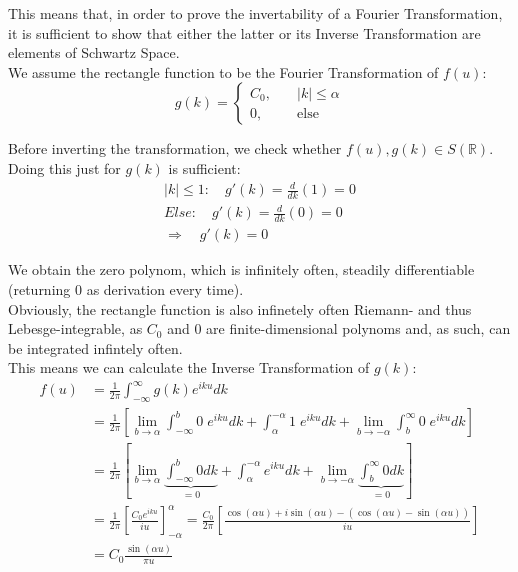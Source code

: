 \documentclass[a4paper,german,12pt,smallheadings]{scrartcl}
\begin{document}
\begin{enumerate}[a)]
This means that, in order to prove the invertability of a Fourier Transformation, it is sufficient to show that either the latter or its Inverse Transformation are elements of Schwartz Space.\\

We assume the rectangle function to be the Fourier Transformation of $f(u)$:
\begin{equation*}
g(k)=\begin{cases}C_0, \quad &|k|\le \alpha\\ 0, \quad &\text{else}\end{cases}
\end{equation*}

Before inverting the transformation, we check whether $f(u),g(k)\in S(\mathbb{R})$. Doing this just for $g(k)$ is sufficient:
\begin{align*}
|k|\le 1: \quad g'(k)=\frac{d}{dk}(1)=0\\
Else: \quad g'(k)=\frac{d}{dk}(0)=0\\
\Rightarrow \quad g'(k)=0
\end{align*}

We obtain the zero polynom, which is infinitely often, steadily differentiable (returning 0 as derivation every time).\\
Obviously, the rectangle function is also infinetely often Riemann- and thus Lebesge-integrable, as $C_0$ and $0$ are finite-dimensional polynoms and, as such, can be integrated infintely often.\\

This means we can calculate the Inverse Transformation of $g(k)$:
\begin{align*}
f(u)& =\frac{1}{2\pi}\int_{-\infty}^{\infty}g(k)e^{iku}dk\\
&=\frac{1}{2\pi}\left[\lim\limits_{b\to \alpha} \int_{-\infty}^{b}0 \; e^{iku}dk + \int_{\alpha}^{-\alpha}1\; e^{iku}dk +\lim\limits_{b \to -\alpha}\int_{b}^{\infty}0 \; e^{iku}dk\right]\\
&=\frac{1}{2\pi}\left[\lim\limits_{b\to \alpha} \underbrace{\int_{-\infty}^{b}0dk}_{=0} + \int_{\alpha}^{-\alpha}e^{iku}dk +\lim\limits_{b \to -\alpha}\underbrace{\int_{b}^{\infty}0dk}_{=0}\right]\\
&=\frac{1}{2\pi}\left[\frac{C_0e^{iku}}{iu}\right]^{\alpha}_{-\alpha}=\frac{C_0}{2\pi}\left[\frac{\cos(\alpha u)+i\sin(\alpha u)-(\cos (\alpha u)-\sin(\alpha u))}{iu}\right]\\
&=C_0\frac{\sin(\alpha u)}{\pi u}
\end{align*}


\end{enumerate}
\end{document}

